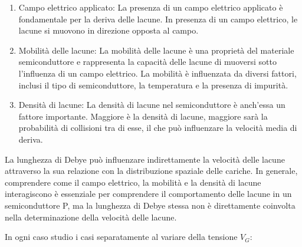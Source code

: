 \begin{ripasso}
\begin{enumerate}
    \item Campo elettrico applicato: La presenza di un campo elettrico applicato è fondamentale per la deriva delle lacune. In presenza di un campo elettrico, le lacune si muovono in direzione opposta al campo.
    \item Mobilità delle lacune: La mobilità delle lacune è una proprietà del materiale semiconduttore e rappresenta la capacità delle lacune di muoversi sotto l'influenza di un campo elettrico. La mobilità è influenzata da diversi fattori, inclusi il tipo di semiconduttore, la temperatura e la presenza di impurità.
    \item Densità di lacune: La densità di lacune nel semiconduttore è anch'essa un fattore importante. Maggiore è la densità di lacune, maggiore sarà la probabilità di collisioni tra di esse, il che può influenzare la velocità media di deriva.
\end{enumerate}
La lunghezza di Debye può influenzare indirettamente la velocità delle lacune attraverso la sua relazione con la distribuzione spaziale delle cariche. In generale, comprendere come il campo elettrico, la mobilità e la densità di lacune interagiscono è essenziale per comprendere il comportamento delle lacune in un semiconduttore P, ma la lunghezza di Debye stessa non è direttamente coinvolta nella determinazione della velocità delle lacune.

\end{ripasso}

In ogni caso studio i casi separatamente al variare della tensione $V_G$:

